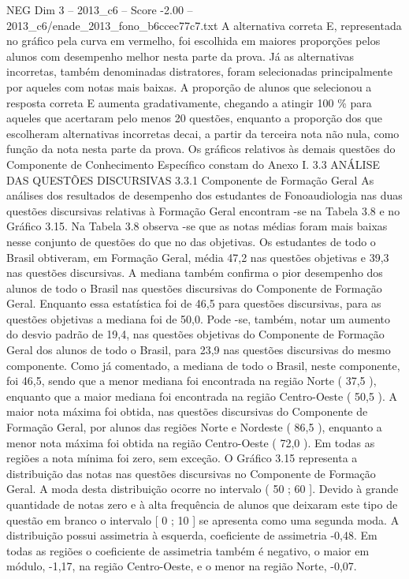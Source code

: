 \begin{textsample}{NEG Dim 3 – 2013\_c6 – Score -2.00 – 2013\_c6/enade\_2013\_fono\_b6ccec77c7.txt}
A alternativa correta E, representada no gráfico pela curva em vermelho, foi escolhida em maiores proporções pelos alunos com desempenho melhor nesta parte da prova.
Já as alternativas incorretas, também denominadas distratores, foram selecionadas principalmente por aqueles com notas mais baixas.
A proporção de alunos que selecionou a resposta correta E aumenta gradativamente, chegando a atingir 100 \% para aqueles que acertaram pelo menos 20 questões, enquanto a proporção dos que escolheram alternativas incorretas decai, a partir da terceira nota não nula, como função da nota nesta parte da prova.
Os gráficos relativos às demais questões do Componente de Conhecimento Específico constam do Anexo I. 3.3 ANÁLISE DAS QUESTÕES DISCURSIVAS 3.3.1 Componente de Formação Geral As análises dos resultados de desempenho dos estudantes de Fonoaudiologia nas duas questões discursivas relativas à Formação Geral encontram -se na Tabela 3.8 e no Gráfico 3.15.
Na Tabela 3.8 observa -se que as notas médias foram mais baixas nesse conjunto de questões do que no das objetivas.
Os estudantes de todo o Brasil obtiveram, em Formação Geral, média 47,2 nas questões objetivas e 39,3 nas questões discursivas.
A mediana também confirma o pior desempenho dos alunos de todo o Brasil nas questões discursivas do Componente de Formação Geral.
Enquanto essa estatística foi de 46,5 para questões discursivas, para as questões objetivas a mediana foi de 50,0.
Pode -se, também, notar um aumento do desvio padrão de 19,4, nas questões objetivas do Componente de Formação Geral dos alunos de todo o Brasil, para 23,9 nas questões discursivas do mesmo componente.
Como já comentado, a mediana de todo o Brasil, neste componente, foi 46,5, sendo que a menor mediana foi encontrada na região Norte ( 37,5 ), enquanto que a maior mediana foi encontrada na região Centro-Oeste ( 50,5 ).
A maior nota máxima foi obtida, nas questões discursivas do Componente de Formação Geral, por alunos das regiões Norte e Nordeste ( 86,5 ), enquanto a menor nota máxima foi obtida na região Centro-Oeste ( 72,0 ).
Em todas as regiões a nota mínima foi zero, sem exceção.
O Gráfico 3.15 representa a distribuição das notas nas questões discursivas no Componente de Formação Geral.
A moda desta distribuição ocorre no intervalo ( 50 ; 60 ].
Devido à grande quantidade de notas zero e à alta frequência de alunos que deixaram este tipo de questão em branco o intervalo [ 0 ; 10 ] se apresenta como uma segunda moda.
A distribuição possui assimetria à esquerda, coeficiente de assimetria -0,48.
Em todas as regiões o coeficiente de assimetria também é negativo, o maior em módulo, -1,17, na região Centro-Oeste, e o menor na região Norte, -0,07.

\end{textsample}
